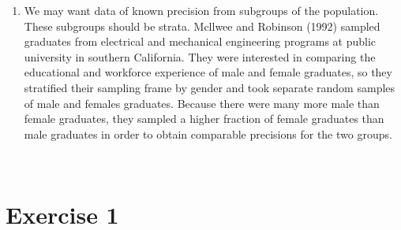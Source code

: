 \documentclass[12pt]{article}
\begin{document}
\begin{enumerate}
{\begin{minipage}[t]{0.97\linewidth}
\begin{enumerate}
\item We may want data of known precision from subgroups of the population. These subgroups should be strata. Mcllwee and Robinson (1992) sampled graduates from electrical and mechanical engineering programs at public university in southern California. They were interested in comparing the educational and workforce experience of male and female graduates, so they stratified their sampling frame by gender and took separate random samples of male and females graduates. Because there were many more male than female graduates, they sampled a higher fraction of female graduates than male graduates in order to obtain comparable precisions for the two groups.
\end{enumerate}
\end{minipage}}\\

\end{enumerate}

\section*{Exercise 1}
\end{document}
